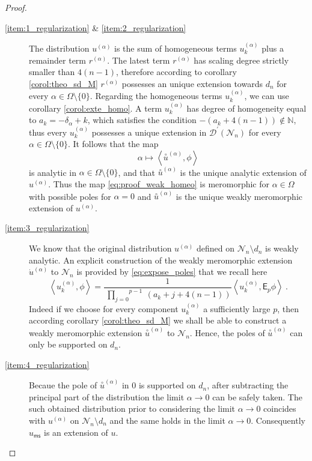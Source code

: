 \documentclass[11pt]{book}
\newcommand{\ms}{\mathsf{ms}}
\newcommand{\sm}[1]{\left\langle#1\right\rangle}
\newcommand{\exte}[1]{\overset{\circ}{#1}}
\newcommand{\Dcal}{\mathcal{D}}
\newcommand{\Ncal}{\mathcal{N}}
\newcommand{\Nbb}{\mathbb{N}}
\newcommand{\Esf}{\mathsf{E}}
\theoremstyle{break}
\begin{document}
\begin{proof}
\begin{description}
%
%
\item[\ref{item:1_regularization} \& \ref{item:2_regularization}] The distribution $u^{(\alpha)}$ is the sum of homogeneous terms $u^{(\alpha)}_k$ plus a remainder term $r^{(\alpha)}$. The latest term $r^{(\alpha)}$ has scaling degree strictly smaller than $4(n-1)$, therefore according to corollary \ref{corol:theo_sd_M} $r^{(\alpha)}$ possesses an unique extension towards $d_n$ for every $\alpha \in \Omega \setminus \{0\}$. Regarding the homogeneous terms $u^{(\alpha)}_k$, we can use corollary \ref{corol:exte_homo}. A term $u^{(\alpha)}_k$ has degree of homogeneity equal to $a_k = -\delta_\alpha + k$, which satisfies the condition $-\left(a_k+4(n-1)\right) \notin \Nbb$, thus every $u^{(\alpha)}_k$ possesses a unique extension in $\Dcal^\prime(\Ncal_n)$ for every $\alpha \in \Omega \setminus \{0\}$. It follows that the map
%
\begin{equation}
\alpha \mapsto \sm{\exte{u}^{(\alpha)} , \phi} 
\label{eq:proof_weak_homeo}
\end{equation}
%
is analytic in $\alpha \in \Omega \setminus \{0\}$, and that $\exte{u}^{(\alpha)}$ is the unique analytic extension of $u^{(\alpha)}$. Thus the map \eqref{eq:proof_weak_homeo} is meromorphic for $\alpha \in \Omega$ with possible poles for $\alpha=0$ and $\exte{u}^{(\alpha)}$ is the unique weakly meromorphic extension of $u^{(\alpha)}$.%
%
%
\item[\ref{item:3_regularization}] We know that the original distribution $u^{(\alpha)}$ defined on $\Ncal_n\setminus d_n$ is weakly analytic. An explicit construction of the weakly meromorphic extension $\dot{u}^{(\alpha)}$ to $\Ncal_n$ is provided by 
\eqref{eq:expose_poles} that we recall here%
%
\begin{equation*}%
\sm{ u^{(\alpha)}_k, \phi } = \frac{1}{\overset{p-1}{\ \underset{j=0}{\prod}} \ (a_k+j+4(n-1))}   \sm{ u^{(\alpha)}_k, \Esf_p \phi } \ .%
\end{equation*}%
%
Indeed if we choose for every component $u^{(\alpha)}_k$ a sufficiently large $p$, then according corollary \ref{corol:theo_sd_M} we shall be able to construct a weakly meromorphic extension $\exte{u}^{(\alpha)}$ to $\Ncal_n$. Hence, the poles of $\exte{u}^{(\alpha)}$ can only be supported on $d_n$.%
%
%
\item[\ref{item:4_regularization}] Becaue the pole of $\exte{u}^{(\alpha)}$ in $0$ is supported on $d_n$, after subtracting the principal part of the distribution the limit $\alpha \to 0$ can be safely taken. The such obtained distribution prior to considering the limit $\alpha \to 0$ coincides with $u^{(\alpha)}$ on $\Ncal_n\setminus d_n$ and the same holds in the limit $\alpha\to 0$. Consequently $u_\ms$ is an extension of $u$.\par%

\end{description}
\end{proof}
\end{document}
